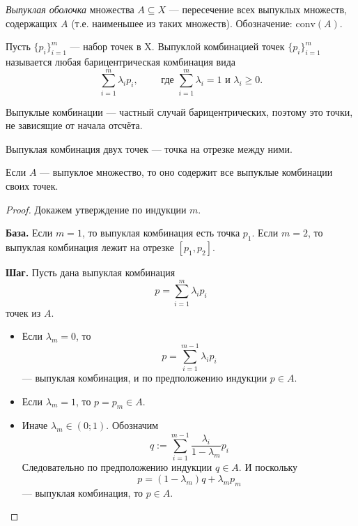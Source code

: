 \documentclass[12pt,a4paper]{article}
\newcommand{\conv}{\ensuremath{\mathrm{conv}}\xspace}
\begin{document}
    \begin{definition}
        \emph{Выпуклая оболочка} множества $A \subseteq X$ --- пересечение всех выпуклых множеств, содержащих $A$ (т.е. наименьшее из таких множеств). Обозначение: $\conv(A)$.
    \end{definition}

    \begin{definition}
        Пусть $\{p_i\}_{i=1}^m$ --- набор точек в X. Выпуклой комбинацией точек $\{p_i\}_{i=1}^m$ называется любая барицентрическая комбинация вида
        \[
            \sum_{i=1}^m \lambda_i p_i,
            \qquad \text{ где } \sum_{i=1}^m \lambda_i = 1 \text{ и } \lambda_i \geqslant 0.
        \]
    \end{definition}

    \begin{remark}
        Выпуклые комбинации --- частный случай барицентрических, поэтому это точки, не зависящие от начала отсчёта.
    \end{remark}

    \begin{remark}
        Выпуклая комбинация двух точек --- точка на отрезке между ними.
    \end{remark}

    \begin{lemma}\label{main-convex-hull-theorem-lemma}
        Если $A$ --- выпуклое множество, то оно содержит все выпуклые комбинации своих точек.
    \end{lemma}

    \begin{proof}
        Докажем утверждение по индукции $m$.

        \textbf{База.} Если $m=1$, то выпуклая комбинация есть точка $p_1$. Если $m=2$, то выпуклая комбинация лежит на отрезке $[p_1, p_2]$.

        \textbf{Шаг.} Пусть дана выпуклая комбинация
        \[p = \sum_{i=1}^m \lambda_i p_i\]
        точек из $A$.
        \begin{itemize}
            \item Если $\lambda_m = 0$, то
                \[p = \sum_{i=1}^{m-1} \lambda_i p_i\]
                --- выпуклая комбинация, и по предположению индукции $p \in A$.
            \item Если $\lambda_m = 1$, то $p = p_m \in A$.
            \item Иначе $\lambda_m \in (0; 1)$. Обозначим
                \[q := \sum_{i=1}^{m-1} \frac{\lambda_i}{1 - \lambda_m} p_i\]
                Следовательно по предположению индукции $q \in A$. И поскольку
                \[p = (1 - \lambda_m)q + \lambda_m p_m\]
                --- выпуклая комбинация, то $p \in A$.
        \end{itemize}
    \end{proof}
\end{document}
